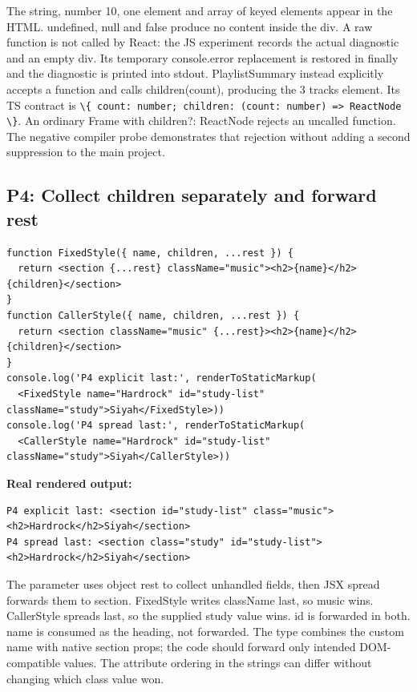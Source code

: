 \documentclass[
  10pt,
  a4paper,
  titlepage]{article}
\newcommand{\passthrough}[1]{#1}
\begin{document}
The string, number 10, one element and array of keyed elements appear in
the HTML. undefined, null and false produce no content inside the div. A
raw function is not called by React: the JS experiment records the
actual diagnostic and an empty div. Its temporary console.error
replacement is restored in finally and the diagnostic is printed into
stdout. PlaylistSummary instead explicitly accepts a function and calls
children(count), producing the 3 tracks element. Its TS contract is
\passthrough{\lstinline!\{ count: number; children: (count: number) => ReactNode \}!}.
An ordinary Frame with children?: ReactNode rejects an uncalled
function. The negative compiler probe demonstrates that rejection
without adding a second suppression to the main project.

\subsection{P4: Collect children separately and forward
rest}\label{p4-collect-children-separately-and-forward-rest}

\Needspace{82.4pt}
\begin{lstlisting}[language=JSX]
function FixedStyle({ name, children, ...rest }) {
  return <section {...rest} className="music"><h2>{name}</h2>{children}</section>
}
function CallerStyle({ name, children, ...rest }) {
  return <section className="music" {...rest}><h2>{name}</h2>{children}</section>
}
console.log('P4 explicit last:', renderToStaticMarkup(
  <FixedStyle name="Hardrock" id="study-list" className="study">Siyah</FixedStyle>))
console.log('P4 spread last:', renderToStaticMarkup(
  <CallerStyle name="Hardrock" id="study-list" className="study">Siyah</CallerStyle>))
\end{lstlisting}


\textbf{Real rendered output:}

\Needspace{41.2pt}
\begin{lstlisting}
P4 explicit last: <section id="study-list" class="music"><h2>Hardrock</h2>Siyah</section>
P4 spread last: <section class="study" id="study-list"><h2>Hardrock</h2>Siyah</section>
\end{lstlisting}

The parameter uses object rest to collect unhandled fields, then JSX
spread forwards them to section. FixedStyle writes className last, so
music wins. CallerStyle spreads last, so the supplied study value wins.
id is forwarded in both. name is consumed as the heading, not forwarded.
The type combines the custom name with native section props; the code
should forward only intended DOM-compatible values. The attribute
ordering in the strings can differ without changing which class value
won.
\end{document}
